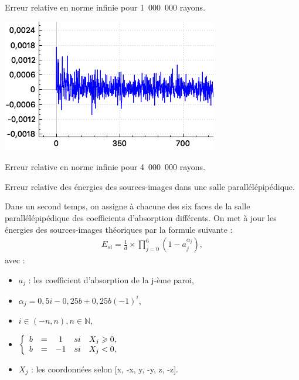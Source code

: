 \begin{figureth}
\begin{subfigureth}{0.49\textwidth}
		\caption{Erreur relative en norme infinie pour 1~000~000 rayons.}
		\label{test3_3}
	\end{subfigureth}
	\begin{subfigureth}{0.49\textwidth}
		\includegraphics[width=\linewidth]{images/test3_4}
		\caption{Erreur relative en norme infinie pour 4~000~000 rayons.}
		\label{test3_4}
	\end{subfigureth}
	\caption{Erreur relative des énergies des sources-images dans une salle parallélépipédique.}
\end{figureth}
		
Dans un second temps, on assigne à chacune des six faces de la salle parallélépipédique des coefficients d'absorption différents. On met à jour les énergies des sources-images théoriques par la formule suivante :
\begin{align}
E_{si} = \frac{1}{d} \times \prod_{j=0}^{6}{(1-a_j^{\alpha_j})}, 
\end{align}
avec : 
\begin{itemize}
\item $a_j$ : les coefficient d'absorption de la j-ème paroi,
\item $\alpha_j  = 0,5i - 0,25b + 0,25b(-1)^i$,
\item $ i \in (-n, n), n \in \mathbb{N}$,
\item  $
 \left \{
   \begin{array}{r c c c l}
       b & = & 1 & si & X_j \geqslant 0, \\
       b & = & -1 & si & X_j < 0,
   \end{array}
   \right.$
\item $X_j$ : les coordonnées selon [x, -x, y, -y, z, -z].
\end{itemize}

